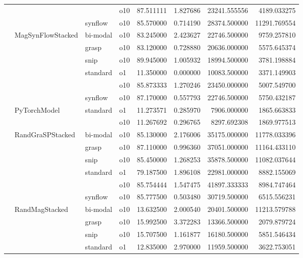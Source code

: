 \begin{longtable}{llllrrrr}
      &     &         & o10 &  87.511111 &   1.827686 &     23241.555556 &   4189.033275 \\
      &     & synflow & o10 &  85.570000 &   0.714190 &     28374.500000 &  11291.769554 \\
      & MagSynFlowStacked & bi-modal & o10 &  83.245000 &   2.423627 &     22746.500000 &   9759.257810 \\
      &     & grasp & o10 &  83.120000 &   0.728880 &     20636.000000 &   5575.645374 \\
      &     & snip & o10 &  89.945000 &   1.005932 &     18994.500000 &   3781.198884 \\
      &     & standard & o1 &  11.350000 &   0.000000 &     10083.500000 &   3371.149903 \\
      &     &         & o10 &  85.873333 &   1.270246 &     23450.000000 &   5007.549700 \\
      &     & synflow & o10 &  87.170000 &   0.557793 &     22746.500000 &   5750.432187 \\
      & PyTorchModel & standard & o1 &  11.273571 &   0.285970 &      7906.000000 &   1865.663833 \\
      &     &         & o10 &  11.267692 &   0.296765 &      8297.692308 &   1869.977513 \\
      & RandGraSPStacked & bi-modal & o10 &  85.130000 &   2.176006 &     35175.000000 &  11778.033396 \\
      &     & grasp & o10 &  87.110000 &   0.996360 &     37051.000000 &  11164.433110 \\
      &     & snip & o10 &  85.450000 &   1.268253 &     35878.500000 &  11082.037644 \\
      &     & standard & o1 &  79.187500 &   1.896108 &     22981.000000 &   8882.155069 \\
      &     &         & o10 &  85.754444 &   1.547475 &     41897.333333 &   8984.747464 \\
      &     & synflow & o10 &  85.777500 &   0.503480 &     30719.500000 &   6515.556231 \\
      & RandMagStacked & bi-modal & o10 &  13.632500 &   2.000540 &     20401.500000 &  11213.579788 \\
      &     & grasp & o10 &  15.992500 &   3.372283 &     13366.500000 &   2079.879724 \\
      &     & snip & o10 &  15.707500 &   1.161877 &     16180.500000 &   5851.546434 \\
      &     & standard & o1 &  12.835000 &   2.970000 &     11959.500000 &   3622.753051 \\

\end{longtable}

